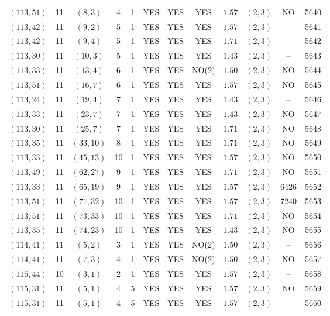 \begin{longtable}{|c|c|c|c|c|c|c|c|c|c|c|c|}
$(113,51)$ & 11 & $(8,3)$ & 4 & 1 & YES & YES & YES & $1.57$ & $(2,3)$ & NO & 5640\\
$(113,42)$ & 11 & $(9,2)$ & 5 & 1 & YES & YES & YES & $1.57$ & $(2,3)$ & -- & 5641\\
$(113,42)$ & 11 & $(9,4)$ & 5 & 1 & YES & YES & YES & $1.71$ & $(2,3)$ & -- & 5642\\
$(113,30)$ & 11 & $(10,3)$ & 5 & 1 & YES & YES & YES & $1.43$ & $(2,3)$ & -- & 5643\\
$(113,33)$ & 11 & $(13,4)$ & 6 & 1 & YES & YES & NO(2) & $1.50$ & $(2,3)$ & NO & 5644\\
$(113,51)$ & 11 & $(16,7)$ & 6 & 1 & YES & YES & YES & $1.57$ & $(2,3)$ & NO & 5645\\
$(113,24)$ & 11 & $(19,4)$ & 7 & 1 & YES & YES & YES & $1.43$ & $(2,3)$ & -- & 5646\\
$(113,33)$ & 11 & $(23,7)$ & 7 & 1 & YES & YES & YES & $1.43$ & $(2,3)$ & NO & 5647\\
$(113,30)$ & 11 & $(25,7)$ & 7 & 1 & YES & YES & YES & $1.71$ & $(2,3)$ & NO & 5648\\
$(113,35)$ & 11 & $(33,10)$ & 8 & 1 & YES & YES & YES & $1.71$ & $(2,3)$ & NO & 5649\\
$(113,33)$ & 11 & $(45,13)$ & 10 & 1 & YES & YES & YES & $1.57$ & $(2,3)$ & NO & 5650\\
$(113,49)$ & 11 & $(62,27)$ & 9 & 1 & YES & YES & YES & $1.71$ & $(2,3)$ & NO & 5651\\
$(113,33)$ & 11 & $(65,19)$ & 9 & 1 & YES & YES & YES & $1.57$ & $(2,3)$ & 6426 & 5652\\
$(113,51)$ & 11 & $(71,32)$ & 10 & 1 & YES & YES & YES & $1.57$ & $(2,3)$ & 7240 & 5653\\
$(113,51)$ & 11 & $(73,33)$ & 10 & 1 & YES & YES & YES & $1.71$ & $(2,3)$ & NO & 5654\\
$(113,35)$ & 11 & $(74,23)$ & 10 & 1 & YES & YES & YES & $1.43$ & $(2,3)$ & NO & 5655\\
$(114,41)$ & 11 & $(5,2)$ & 3 & 1 & YES & YES & NO(2) & $1.50$ & $(2,3)$ & -- & 5656\\
$(114,41)$ & 11 & $(7,3)$ & 4 & 1 & YES & YES & NO(2) & $1.50$ & $(2,3)$ & NO & 5657\\
$(115,44)$ & 10 & $(3,1)$ & 2 & 1 & YES & YES & YES & $1.57$ & $(2,3)$ & -- & 5658\\
$(115,31)$ & 11 & $(5,1)$ & 4 & 5 & YES & YES & YES & $1.57$ & $(2,3)$ & NO & 5659\\
$(115,31)$ & 11 & $(5,1)$ & 4 & 5 & YES & YES & YES & $1.57$ & $(2,3)$ & -- & 5660\\

\end{longtable}
